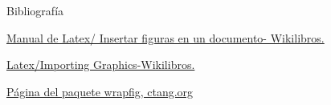 \documentclass{beamer}
\begin{document}
\begin{frame}[fragile]{Bibliograf\'ia}
\begin{thebibliography}{10}
 \href{http://es.wikibooks.org/wiki/Manual_de_LaTeX/Insertar_figuras_en_un_documento}{Manual de Latex/ Insertar figuras en un documento- Wikilibros.}

\href{http://en.wikibooks.org/wiki/LaTeX/Importing_Graphics}{Latex/Importing Graphics-Wikilibros.}

 \href{http://www.ctan.org/pkg/wrapfig}{P\'agina del paquete wrapfig, ctang.org}

\end{thebibliography}
\end{frame}
\end{document}
